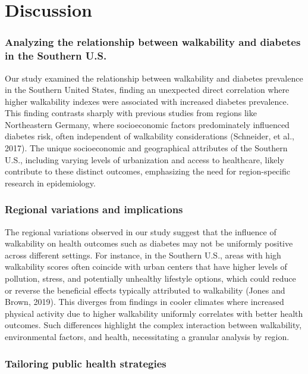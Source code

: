 \documentclass[
]{article}
\begin{document}
\section{Discussion}\label{discussion}

\subsubsection{Analyzing the relationship between walkability and
diabetes in the Southern
U.S.}\label{analyzing-the-relationship-between-walkability-and-diabetes-in-the-southern-u.s.}

Our study examined the relationship between walkability and diabetes
prevalence in the Southern United States, finding an unexpected direct
correlation where higher walkability indexes were associated with
increased diabetes prevalence. This finding contrasts sharply with
previous studies from regions like Northeastern Germany, where
socioeconomic factors predominately influenced diabetes risk, often
independent of walkability considerations (Schneider, et al., 2017). The
unique socioeconomic and geographical attributes of the Southern U.S.,
including varying levels of urbanization and access to healthcare,
likely contribute to these distinct outcomes, emphasizing the need for
region-specific research in epidemiology.

\subsubsection{Regional variations and
implications}\label{regional-variations-and-implications}

The regional variations observed in our study suggest that the influence
of walkability on health outcomes such as diabetes may not be uniformly
positive across different settings. For instance, in the Southern U.S.,
areas with high walkability scores often coincide with urban centers
that have higher levels of pollution, stress, and potentially unhealthy
lifestyle options, which could reduce or reverse the beneficial effects
typically attributed to walkability (Jones and Brown, 2019). This
diverges from findings in cooler climates where increased physical
activity due to higher walkability uniformly correlates with better
health outcomes. Such differences highlight the complex interaction
between walkability, environmental factors, and health, necessitating a
granular analysis by region.

\subsubsection{Tailoring public health
strategies}\label{tailoring-public-health-strategies}
\end{document}
